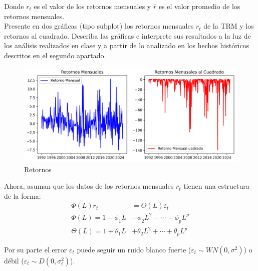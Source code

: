 \documentclass{article}
\theoremstyle{remark}
\theoremstyle{definition}
\begin{document}
\begin{enumerate}[label = \emph{\alph*})]
    {Donde $r_t$ es el valor de los retornos mensuales y $\bar{r}$ es el valor promedio de los retornos mensuales.} \\
    
    {Presente en dos gr\'aficas (tipo subplot) los retornos mensuales $r_t$ de la TRM y los retornos al cuadrado. Describa las gr\'aficas e interprete sus resultados a la luz de los an\'alisis realizados en clase y a partir de lo analizado en los hechos hist\'oricos descritos en el segundo apartado.}
        \begin{tcolorbox}[title=Soluci\'on 2.c]
            \begin{figure}[H]
                \centering
                \includegraphics[width=0.9\linewidth]{output/subplot_retornos.png}
                \caption{Retornos}
                \label{fig:retorno}
            \end{figure}
        \end{tcolorbox}
\end{enumerate}

{Ahora, asuman que los datos de los retornos mensuales $r_t$ tienen una estructura de la forma:}
\begin{align*}
    \Phi(L)r_t &= \Theta(L)\varepsilon_t \\
    \Phi(L) = 1 − \phi_1L &− \phi_2L^2 − \cdots − \phi_pL^p \\
    \Theta(L) = 1 + \theta_1L &+ \theta_2L^2 + \cdots + \theta_pL^p
\end{align*}

{Por su parte el error $\varepsilon_t$ puede seguir un ruido blanco fuerte ($\varepsilon_t\sim WN(0,
\sigma^2)$) o d\'ebil ($\varepsilon_t\sim D(0,\sigma_t^2)$).}
\end{document}
